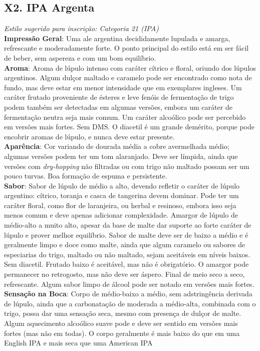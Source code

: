 \subsection*{X2. IPA Argenta}

\textit{Estilo sugerido para inscrição: Categoria 21 (IPA)}\\
\textbf{Impressão Geral}: Uma ale argentina decididamente lupulada e amarga, refrescante e moderadamente forte. O ponto principal do estilo está em ser fácil de beber, sem aspereza e com um bom equilíbrio. \\
\textbf{Aroma}: Aroma de lúpulo intenso com caráter cítrico e floral, oriundo dos lúpulos argentinos. Algum dulçor maltado e caramelo pode ser encontrado como nota de fundo, mas deve estar em menor intensidade que em exemplares ingleses. Um caráter frutado proveniente de ésteres e leve fenóis de fermentação de trigo podem também ser detectadas em algumas versões, embora um caráter de fermentação neutra seja mais comum. Um caráter alcoólico pode ser percebido em versões mais fortes. Sem DMS. O diacetil é um grande demérito, porque pode encobrir aromas de lúpulo, e nunca deve estar presente. \\
\textbf{Aparência}: Cor variando de dourada média a cobre avermelhada médio; algumas versões podem ter um tom alaranjado. Deve ser límpida, ainda que versões com \textit{dry-hopping} não filtradas ou com trigo não maltado possam ser um pouco turvas. Boa formação de espuma e persistente. \\
\textbf{Sabor}: Sabor de lúpulo de médio a alto, devendo refletir o caráter de lúpulo argentino: cítrico, toranja e casca de tangerina devem dominar. Pode ter um caráter floral, como flor de laranjeira, ou herbal e resinoso, embora isso seja menos comum e deve apenas adicionar complexidade. Amargor de lúpulo de médio-alto a muito alto, apesar da base de malte dar suporte ao forte caráter de lúpulo e prover melhor equilíbrio. Sabor de malte deve ser de baixo a médio e é geralmente limpo e doce como malte, ainda que algum caramelo ou sabores de especiarias do trigo, maltado ou não maltado, sejam aceitáveis em níveis baixos. Sem diacetil. Frutado baixo é aceitável, mas não é obrigatório. O amargor pode permanecer no retrogosto, mas não deve ser áspero. Final de meio seco a seco, refrescante. Algum sabor limpo de álcool pode ser notado em versões mais fortes. \\
\textbf{Sensação na Boca}: Corpo de médio-baixo a médio, sem adstringência derivada de lúpulo, ainda que a carbonatação de moderada a médio-alta, combinada com o trigo, possa dar uma sensação seca, mesmo com presença de dulçor de malte. Algum aquecimento alcoólico suave pode e deve ser sentido em versões mais fortes (mas não em todas). O corpo geralmente é mais baixo do que em uma English IPA e mais seca que uma American IPA \\
